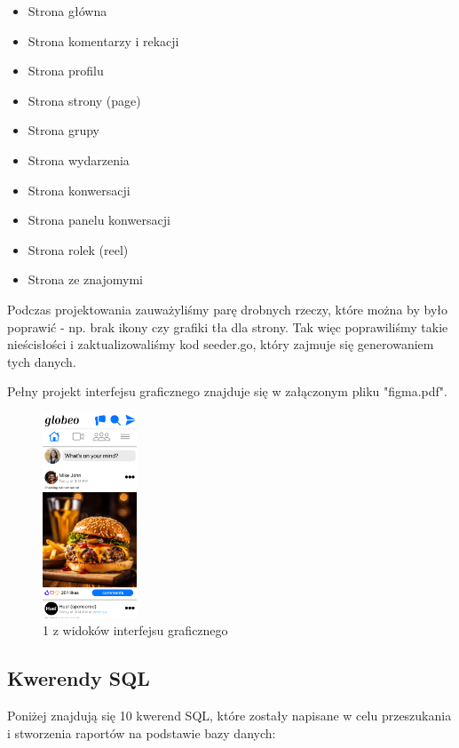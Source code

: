 \documentclass{article}
\begin{document}
\begin{itemize}
    \item Strona główna
    \item Strona komentarzy i rekacji
    \item Strona profilu
    \item Strona strony (page)
    \item Strona grupy
    \item Strona wydarzenia
    \item Strona konwersacji
    \item Strona panelu konwersacji
    \item Strona rolek (reel)
    \item Strona ze znajomymi
\end{itemize}

\quad Podczas projektowania zauważyliśmy parę drobnych rzeczy, które można by było poprawić - np. brak ikony czy grafiki tła dla strony. Tak więc poprawiliśmy takie nieścisłości i zaktualizowaliśmy kod seeder.go, który zajmuje się generowaniem tych danych.

\quad Pełny projekt interfejsu graficznego znajduje się w załączonym pliku "figma.pdf".

\begin{figure}[H]
    \centering
    \includegraphics[width=0.25\textwidth]{images/figma.png}
    \caption{1 z widoków interfejsu graficznego}
    \label{fig:figma}
\end{figure}

\subsection{Kwerendy SQL}
\quad Poniżej znajdują się 10 kwerend SQL, które zostały napisane w celu przeszukania i stworzenia raportów na podstawie bazy danych:
\end{document}
